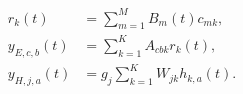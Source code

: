 \documentclass{article}
\begin{document}
\fontsize{22}{29}\selectfont
\[
\begin{aligned}r_k(t)&=\sum_{m=1}^{M} B_m(t)c_{mk},\\ y_{E,c,b}(t)&=\sum_{k=1}^{K}A_{cbk}r_k(t),\\ y_{H,j,a}(t)&=g_j\sum_{k=1}^{K}W_{jk}h_{k,a}(t).\end{aligned}
\]
\end{document}
